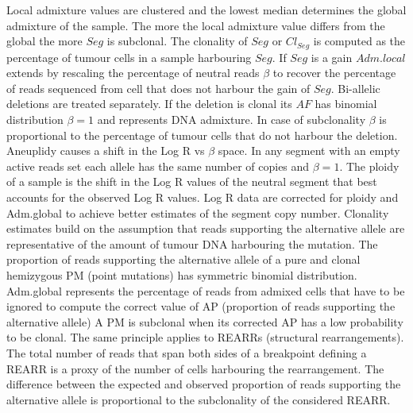 	Local admixture values are clustered and the lowest median determines the global admixture of the sample.
	The more the local admixture value differs from the global the more $Seg$ is subclonal.
	The clonality of $Seg$ or $Cl_{Seg}$ is computed as the percentage of tumour cells in a sample harbouring $Seg$.
	If $Seg$ is a gain $Adm.local$ extends by rescaling the percentage of neutral reads $\beta$ to recover the percentage of reads sequenced from cell that does not harbour the gain of $Seg$.
	Bi-allelic deletions are treated separately.
	If the deletion is clonal its $AF$ has binomial distribution $\beta=1$ and represents DNA admixture.
	In case of subclonality $\beta$ is proportional to the percentage of tumour cells that do not harbour the deletion.
	Aneuplidy causes a shift in the Log R vs $\beta$ space.
	In any segment with an empty active reads set each allele has the same number of copies and $\beta=1$.
	The ploidy of a sample is the shift in the Log R values of the neutral segment that best accounts for the observed Log R values.
	Log R data are corrected for ploidy and Adm.global to achieve better estimates of the segment copy number.
	Clonality estimates build on the assumption that reads supporting the alternative allele are representative of the amount of tumour DNA harbouring the mutation.
	The proportion of reads supporting the alternative allele of a pure and clonal hemizygous PM (point mutations) has symmetric binomial distribution.
	Adm.global represents the percentage of reads from admixed cells that have to be ignored to compute the correct value of AP (proportion of reads supporting the alternative allele)
	A PM is subclonal when its corrected AP has a low probability to be clonal.
	The same principle applies to REARRs (structural rearrangements).
	The total number of reads that span both sides of a breakpoint defining a REARR is a proxy of the number of cells harbouring the rearrangement.
	The difference between the expected and observed proportion of reads supporting the alternative allele is proportional  to the subclonality of the considered REARR.

